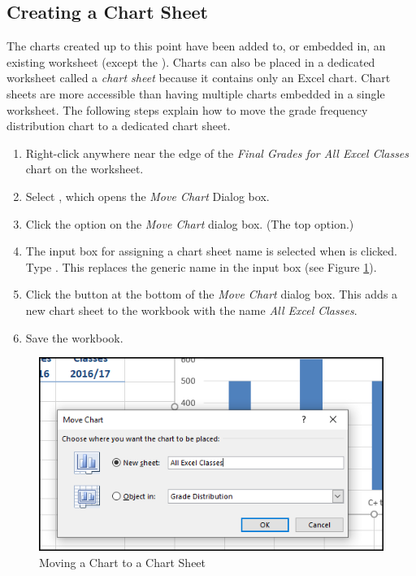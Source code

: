 \subsection{Creating a Chart Sheet}

The charts created up to this point have been added to, or embedded in, an existing worksheet (except the ). Charts can also be placed in a dedicated worksheet called a \textit{chart sheet} because it contains only an Excel chart. Chart sheets are more accessible than having multiple charts embedded in a single worksheet. The following steps explain how to move the grade frequency distribution chart to a dedicated chart sheet.

\begin{enumbox}
	\begin{enumerate}
		\item Right-click anywhere near the edge of the \textit{Final Grades for All Excel Classes} chart on the  worksheet.
		\item Select , which opens the \textit{Move Chart} Dialog box.
		\item Click the  option on the \textit{Move Chart} dialog box. (The top option.)
		\item The input box for assigning a chart sheet name is selected when  is clicked. Type . This replaces the generic name in the input box (see Figure \ref{04:fig15}).
		\item Click the  button at the bottom of the \textit{Move Chart} dialog box. This adds a new chart sheet to the workbook with the name \textit{All Excel Classes}.
		\item Save the  workbook.
	\end{enumerate}
\end{enumbox}
	
\begin{figure}[H]
	\centering
	\includegraphics[width=\maxwidth{.95\linewidth}]{gfx/ch04_fig15}
	\caption{Moving a Chart to a Chart Sheet}
	\label{04:fig15}
\end{figure}


